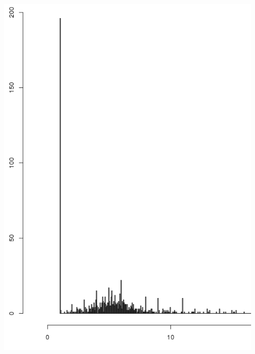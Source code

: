 \documentclass{homework}
\begin{document}
\begin{enumerate}
\begin{enumerate}
\includegraphics[scale=0.3]{../data/aufg_36_3_a}

\end{enumerate}
\end{enumerate}
\end{document}
